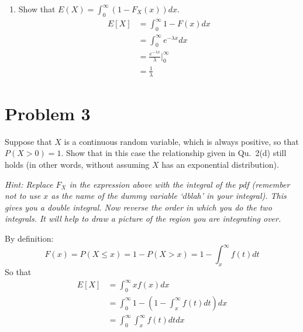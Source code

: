 \documentclass{article}
\newcommand{\1}{\mathbf{1}}
\begin{document}
\begin{enumerate}
    \newpage
    \item Show that $E(X) = \int_0^\infty (1-F_X(x)) dx.$
    \begin{align*}
        E[X] &= \int_0^\infty 1-F(x) dx \\
        &= \int_0^\infty e^{-\lambda x} dx \\
        &= \frac{e^{-\lambda x}}{\lambda} \bigg|_0^\infty \\
        &=\frac{1}{\lambda}
    \end{align*}
\end{enumerate}	
	


\newpage
\section*{Problem 3}
Suppose that $X$ is a continuous random variable, which is always positive, so that $P(X> 0)=1$.
Show that in this case the relationship given in Qu.~2(d) still holds (in other words, without assuming $X$ has
an exponential distribution).\par
{\it Hint: Replace $F_X$ in the expression above with the integral of the pdf (remember not to use $x$ as the name of the dummy variable `$d$blah' in your integral). This gives you a double integral. Now reverse the order in which you do the two integrals. It will help to draw a picture of the region you are integrating over.}

By definition:
$$ F(x) = P(X\leq x) = 1 - P(X>x) = 1 - \int_x^\infty f(t) dt$$
So that
\begin{align*}
    E[X] &=  \int_0^\infty xf(x) dx \\
    &=\int_0^\infty 1- \left(1 - \int_x^\infty f(t) dt\right) dx \\
    &= \int_0^\infty\int_x^\infty f(t) dtdx 
\end{align*}
\end{document}
